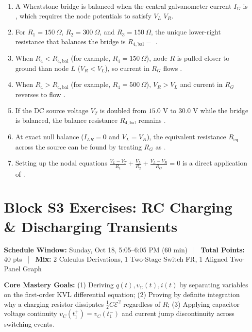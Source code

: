 \documentclass[10pt,letterpaper]{article}
\begin{document}
\begin{enumerate}
  \item A Wheatstone bridge is balanced when the central galvanometer current $I_G$ is \underline{\hspace{1.8in}}, which requires the node potentials to satisfy $V_L$ \underline{\hspace{1.8in}} $V_R$.
  \item For $R_1 = 150\ \Omega$, $R_2 = 300\ \Omega$, and $R_3 = 150\ \Omega$, the unique lower-right resistance that balances the bridge is $R_{4,\text{bal}} =$ \underline{\hspace{1.8in}}.
  \item When $R_4 < R_{4,\text{bal}}$ (for example, $R_4 = 150\ \Omega$), node $R$ is pulled closer to ground than node $L$ ($V_R < V_L$), so current in $R_G$ flows \underline{\hspace{1.8in}}.
  \item When $R_4 > R_{4,\text{bal}}$ (for example, $R_4 = 500\ \Omega$), $V_R > V_L$ and current in $R_G$ reverses to flow \underline{\hspace{1.8in}}.
  \item If the DC source voltage $V_T$ is doubled from $15.0\text{ V}$ to $30.0\text{ V}$ while the bridge is balanced, the balance resistance $R_{4,\text{bal}}$ remains \underline{\hspace{1.8in}}.
  \item At exact null balance ($I_{LR} = 0$ and $V_L = V_R$), the equivalent resistance $R_{\text{eq}}$ across the source can be found by treating $R_G$ as \underline{\hspace{1.8in}}.
  \item Setting up the nodal equations $\frac{V_L - V_T}{R_1} + \frac{V_L}{R_2} + \frac{V_L - V_R}{R_G} = 0$ is a direct application of \underline{\hspace{1.8in}}.
\end{enumerate}
\newpage
\section*{Block S3 Exercises: RC Charging \& Discharging Transients}

  \textbf{Schedule Window:} Sunday, Oct 18, 5:05--6:05 PM (60 min) ~|~
  \textbf{Total Points:} 40 pts ~|~
  \textbf{Mix:} 2 Calculus Derivations, 1 Two-Stage Switch FR, 1 Aligned Two-Panel Graph



  \textbf{Core Mastery Goals:} (1) Deriving $q(t), v_C(t), i(t)$ by separating variables on the first-order KVL differential equation; (2) Proving by definite integration why a charging resistor dissipates $\frac{1}{2}C\mathcal{E}^2$ regardless of $R$; (3) Applying capacitor voltage continuity $v_C(t_1^+) = v_C(t_1^-)$ and current jump discontinuity across switching events.
\end{document}
